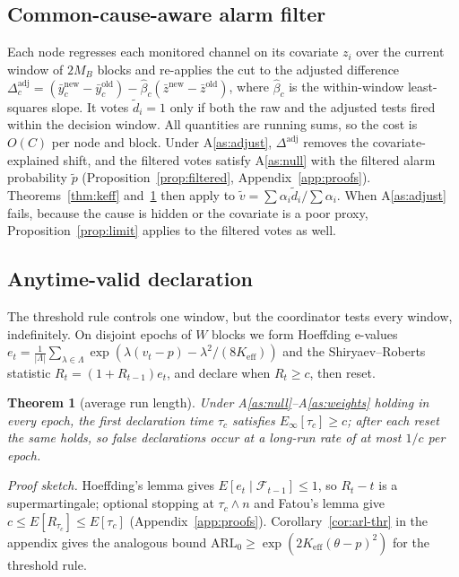 \IfFileExists{IEEEtran.cls}{\documentclass[journal]{IEEEtran}\newcommand{\ieeemode}{}}{\documentclass[10pt,twocolumn,letterpaper]{article}\usepackage[margin=0.72in,columnsep=0.22in]{geometry}}
\newtheorem{theorem}{Theorem}
\newcommand{\Keff}{K_{\mathrm{eff}}}
\newcommand{\ARL}{\mathrm{ARL}_0}
\begin{document}
\subsection{Common-cause-aware alarm filter}
Each node regresses each monitored channel on its covariate $z_i$ over the current window of $2M_B$ blocks and re-applies the cut to the adjusted difference
$\Delta^{\text{adj}}_c=(\bar y^{\text{new}}_c-\bar y^{\text{old}}_c)-\hat\beta_c(\bar z^{\text{new}}-\bar z^{\text{old}})$, where $\hat\beta_c$ is the within-window least-squares slope. It votes $\tilde d_i=1$ only if both the raw and the adjusted tests fired within the decision window. All quantities are running sums, so the cost is $O(C)$ per node and block. Under A\ref{as:adjust}, $\Delta^{\text{adj}}$ removes the covariate-explained shift, and the filtered votes satisfy A\ref{as:null} with the filtered alarm probability $\tilde p$ (Proposition~\ref{prop:filtered}, Appendix~\ref{app:proofs}). Theorems~\ref{thm:keff} and~\ref{thm:arl} then apply to $\tilde v=\sum\alpha_i\tilde d_i/\sum\alpha_i$. When A\ref{as:adjust} fails, because the cause is hidden or the covariate is a poor proxy, Proposition~\ref{prop:limit} applies to the filtered votes as well.

\subsection{Anytime-valid declaration}
The threshold rule controls one window, but the coordinator tests every window, indefinitely. On disjoint epochs of $W$ blocks we form Hoeffding e-values $e_t=\frac{1}{|\Lambda|}\sum_{\lambda\in\Lambda}\exp(\lambda(v_t-p)-\lambda^2/(8\Keff))$ and the Shiryaev--Roberts statistic $R_t=(1+R_{t-1})e_t$, and declare when $R_t\ge c$, then reset.
\begin{theorem}[average run length]\label{thm:arl}
Under A\ref{as:null}--A\ref{as:weights} holding in every epoch, the first declaration time $\tau_c$ satisfies $E_\infty[\tau_c]\ge c$; after each reset the same holds, so false declarations occur at a long-run rate of at most $1/c$ per epoch.
\end{theorem}
\noindent\emph{Proof sketch.} Hoeffding's lemma gives $E[e_t\mid\mathcal F_{t-1}]\le1$, so $R_t-t$ is a supermartingale; optional stopping at $\tau_c\wedge n$ and Fatou's lemma give $c\le E[R_{\tau_c}]\le E[\tau_c]$ (Appendix~\ref{app:proofs}). Corollary~\ref{cor:arl-thr} in the appendix gives the analogous bound $\ARL\ge\exp(2\Keff(\theta-p)^2)$ for the threshold rule.
\end{document}
